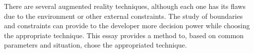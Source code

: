 There are several augmented reality techniques, although each one has its flaws due to the environment or other external constraints. The study of boundaries and constraints can provide to the developer more decision power while choosing the appropriate technique. This essay provides a method to, based on common parameters and situation, chose the appropriated technique.




